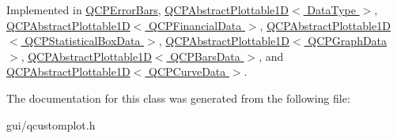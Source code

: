 Implemented in \hyperlink{classQCPErrorBars_af75958b95d9b9c7edfd9851c1d123850}{Q\+C\+P\+Error\+Bars}, \hyperlink{classQCPAbstractPlottable1D_afe0d56e39cc076032922f059b304c092}{Q\+C\+P\+Abstract\+Plottable1\+D$<$ Data\+Type $>$}, \hyperlink{classQCPAbstractPlottable1D_afe0d56e39cc076032922f059b304c092}{Q\+C\+P\+Abstract\+Plottable1\+D$<$ Q\+C\+P\+Financial\+Data $>$}, \hyperlink{classQCPAbstractPlottable1D_afe0d56e39cc076032922f059b304c092}{Q\+C\+P\+Abstract\+Plottable1\+D$<$ Q\+C\+P\+Statistical\+Box\+Data $>$}, \hyperlink{classQCPAbstractPlottable1D_afe0d56e39cc076032922f059b304c092}{Q\+C\+P\+Abstract\+Plottable1\+D$<$ Q\+C\+P\+Graph\+Data $>$}, \hyperlink{classQCPAbstractPlottable1D_afe0d56e39cc076032922f059b304c092}{Q\+C\+P\+Abstract\+Plottable1\+D$<$ Q\+C\+P\+Bars\+Data $>$}, and \hyperlink{classQCPAbstractPlottable1D_afe0d56e39cc076032922f059b304c092}{Q\+C\+P\+Abstract\+Plottable1\+D$<$ Q\+C\+P\+Curve\+Data $>$}.



The documentation for this class was generated from the following file\+:\begin{DoxyCompactItemize}
\item 
gui/qcustomplot.\+h\end{DoxyCompactItemize}
